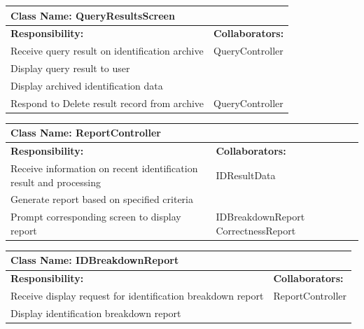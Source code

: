 \documentclass[]{article}
\begin{document}
\newpage
	\begin{table}[ht]
		\centering
		\begin{tabular}{|p{5cm}|p{5cm}|}
		\hline 
		 \multicolumn{2}{|l|}{\textbf{Class Name: QueryResultsScreen}} \\
		\hline
		\textbf{Responsibility:} & \textbf{Collaborators:} \\
		\hline
		Receive query result on identification archive & QueryController \\
		\hline
		Display query result to user &  \\
		\hline
		Display archived identification data &  \\
		\hline
		Respond to Delete result record from archive & QueryController \\
		\hline
		\end{tabular}
	\end{table}
	
	\begin{table}[ht]
		\centering
		\begin{tabular}{|p{5cm}|p{5cm}|}
		\hline 
		 \multicolumn{2}{|l|}{\textbf{Class Name: ReportController}} \\
		\hline
		\textbf{Responsibility:} & \textbf{Collaborators:} \\
		\hline
		Receive information on recent identification result and processing & IDResultData \\
		\hline
		Generate report based on specified criteria &  \\
		\hline
		Prompt corresponding screen to display report & IDBreakdownReport \mbox{CorrectnessReport} \\
		\hline
		\end{tabular}
	\end{table}
	
	\begin{table}[ht]
		\centering
		\begin{tabular}{|p{5cm}|p{5cm}|}
		\hline 
		 \multicolumn{2}{|l|}{\textbf{Class Name: IDBreakdownReport}} \\
		\hline
		\textbf{Responsibility:} & \textbf{Collaborators:} \\
		\hline
		Receive display request for identification breakdown report & ReportController \\
		\hline
		Display identification breakdown report &  \\
		\hline
		\end{tabular}
	\end{table}
	
\end{document}
